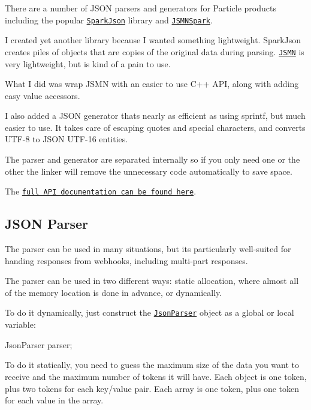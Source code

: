 There are a number of J\+S\+ON parsers and generators for Particle products including the popular \href{https://github.com/menan/sparkjson}{\tt Spark\+Json} library and \href{https://github.com/menan/jsmnspark}{\tt J\+S\+M\+N\+Spark}.

I created yet another library because I wanted something lightweight. Spark\+Json creates piles of objects that are copies of the original data during parsing. \href{https://github.com/zserge/jsmn}{\tt J\+S\+MN} is very lightweight, but is kind of a pain to use.

What I did was wrap J\+S\+MN with an easier to use C++ A\+PI, along with adding easy value accessors.

I also added a J\+S\+ON generator that\textquotesingle{}s nearly as efficient as using sprintf, but much easier to use. It takes care of escaping quotes and special characters, and converts U\+T\+F-\/8 to J\+S\+ON U\+T\+F-\/16 entities.

The parser and generator are separated internally so if you only need one or the other the linker will remove the unnecessary code automatically to save space.

The \href{http://rickkas7.github.io/JsonParserGeneratorRK/}{\tt full A\+PI documentation can be found here}.

\subsection*{J\+S\+ON Parser}

The parser can be used in many situations, but it\textquotesingle{}s particularly well-\/suited for handing responses from webhooks, including multi-\/part responses.

The parser can be used in two different ways\+: static allocation, where almost all of the memory location is done in advance, or dynamically.

To do it dynamically, just construct the \href{http://rickkas7.github.io/JsonParserGeneratorRK/class_json_parser.html}{\tt Json\+Parser} object as a global or local variable\+:


\begin{DoxyCode}
JsonParser parser;
\end{DoxyCode}


To do it statically, you need to guess the maximum size of the data you want to receive and the maximum number of tokens it will have. Each object is one token, plus two tokens for each key/value pair. Each array is one token, plus one token for each value in the array.

